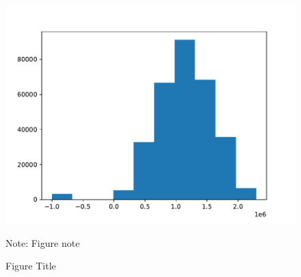 \begin{figure}[H]
\caption{Figure Title}

\begin{centering}
\includegraphics[scale=0.7]{../input/chips_sold}
\par\end{centering}
Note: Figure note
\end{figure}

